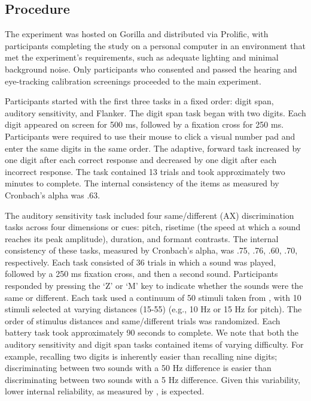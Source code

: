 \subsection{Procedure}

The experiment was hosted on Gorilla \citep{Anwyl-Irvine_2019} and distributed via Prolific, with participants completing the study on a personal computer in an environment that met the experiment’s requirements, such as adequate lighting and minimal background noise. Only participants who consented and passed the hearing and eye-tracking calibration screenings proceeded to the main experiment.

Participants started with the first three tasks in a fixed order: digit span, auditory sensitivity, and Flanker. The digit span task began with two digits. Each digit appeared on screen for 500 ms, followed by a fixation cross for 250 ms. Participants were required to use their mouse to click a visual number pad and enter the same digits in the same order. The adaptive, forward task increased by one digit after each correct response and decreased by one digit after each incorrect response. The task contained 13 trials and took approximately two minutes to complete. The internal consistency of the items as measured by Cronbach's alpha was .63. 

The auditory sensitivity task included four same/different (AX) discrimination tasks across four dimensions or cues:  pitch, risetime (the speed at which a sound reaches its peak amplitude), duration, and formant contrasts. The internal consistency of these tasks, measured by Cronbach’s alpha, was .75, .76, .60, .70, respectively. Each task consisted of 36 trials in which a sound was played, followed by a 250 ms fixation cross, and then a second sound. Participants responded by pressing the ‘Z’ or ‘M’ key to indicate whether the sounds were the same or different. Each task used a continuum of 50 stimuli taken from \citep{Kachlicka_Saito_Tierney_2019}, with 10 stimuli selected at varying distances (15-55) (e.g., 10 Hz or 15 Hz for pitch). The order of stimulus distances and same/different trials was randomized. Each battery task took approximately 90 seconds to complete. We note that both the auditory sensitivity and digit span tasks contained items of varying difficulty. For example, recalling two digits is inherently easier than recalling nine digits; discriminating between two sounds with a 50 Hz difference is easier than discriminating between two sounds with a 5 Hz difference. Given this variability, lower internal reliability, as measured by \cite{Cronbach1951}, is expected. 

